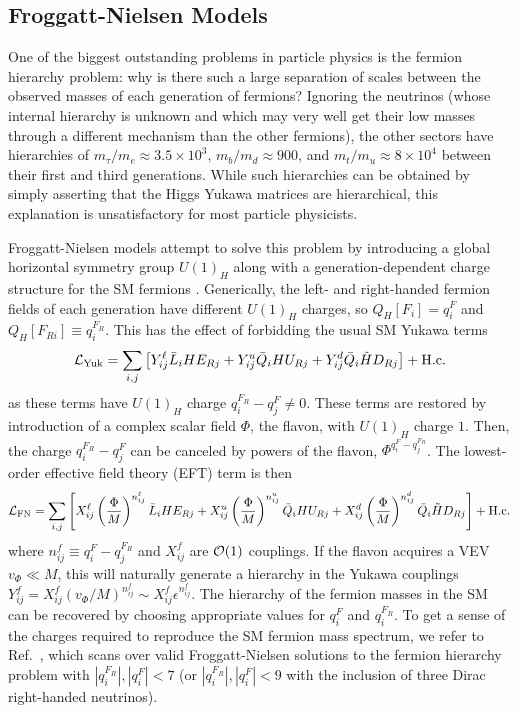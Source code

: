 \subsection{Froggatt-Nielsen Models}\label{sec:FN}
One of the biggest outstanding problems in particle physics is the fermion hierarchy problem: why is there such a large separation of scales between the observed masses of each generation of fermions? Ignoring the neutrinos (whose internal hierarchy is unknown and which may very well get their low masses through a different mechanism than the other fermions), the other sectors have hierarchies of $m_\tau/m_e \approx 3.5\times 10^3$, $m_b/m_d \approx 900$, and $m_t/m_u \approx 8\times 10^4$ between their first and third generations. While such hierarchies can be obtained by simply asserting that the Higgs Yukawa matrices are hierarchical, this explanation is unsatisfactory for most particle physicists.

Froggatt-Nielsen models attempt to solve this problem by introducing a global horizontal symmetry group $U(1)_H$ along with a generation-dependent charge structure for the SM fermions \cite{Froggatt:1978nt}. Generically, the left- and right-handed fermion fields of each generation have different $U(1)_H$ charges, so $Q_H[F_{i}] = q^{F}_i$ and $Q_H[F_{Ri}]\equiv q^{F_R}_i$. This has the effect of forbidding the usual SM Yukawa terms
\begin{align}
    {\cal L}_{\rm Yuk} = \sum_{i,j}\left[Y_{ij}^\ell\bar{L}_{i} H E_{Rj} +Y_{ij}^u\bar{Q}_{i} H U_{Rj} +Y_{ij}^d\bar{Q}_{i} \tilde{H} D_{Rj} \right] + {\rm H.c.}
\end{align}
as these terms have $U(1)_{H}$ charge $q_i^{F_R} - q_j^{F} \neq 0$. These terms are restored by introduction of a complex scalar field $\Phi$, the flavon, with $U(1)_H$ charge $1$. Then, the charge $q_i^{F_R} - q_j^{F}$ can be canceled by powers of the flavon, $\Phi^{q_i^{F} - q_j^{F_R}}$. The lowest-order effective field theory (EFT) term is then
\begin{align}
    {\cal L}_{\rm FN} = \sum_{i,j}\left[X_{ij}^\ell\left(\frac{\Phi}{M}\right)^{n_{ij}^\ell}\bar{L}_{i} H E_{Rj} +X_{ij}^u\left(\frac{\Phi}{M}\right)^{n_{ij}^u}\bar{Q}_{i} H U_{Rj} +X_{ij}^d\left(\frac{\Phi}{M}\right)^{n_{ij}^d}\bar{Q}_{i} \tilde{H} D_{Rj} \right] + {\rm H.c.}
\end{align}
where $n_{ij}^f \equiv q_i^{F} - q_j^{F_R}$ and $X_{ij}^f$ are ${\cal O}(1)$ couplings. If the flavon acquires a VEV $v_\Phi \ll M$, this will naturally generate a hierarchy in the Yukawa couplings $Y_{ij}^f = X_{ij}^f(v_\Phi/M)^{n_{ij}^f} \sim X_{ij}^f\epsilon^{n_{ij}^f}$. The hierarchy of the fermion masses in the SM can be recovered by choosing appropriate values for $q_i^{F}$ and $q_i^{F_R}$. To get a sense of the charges required to reproduce the SM fermion mass spectrum, we refer to Ref.~\cite{Cornella:2024jaw}, which scans over valid Froggatt-Nielsen solutions to the fermion hierarchy problem with $|q_i^{F_R}|, |q_i^F| < 7$ (or $|q_i^{F_R}|, |q_i^F| < 9$ with the inclusion of three Dirac right-handed neutrinos).

